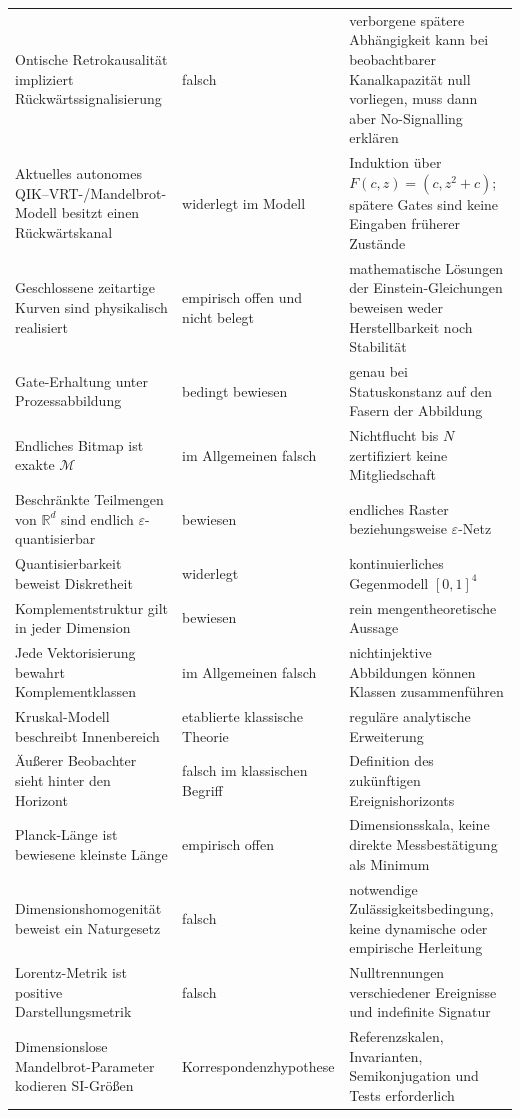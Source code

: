 \documentclass[11pt,a4paper]{article}
\theoremstyle{remark}
\newcommand{\M}{\mathcal{M}}
\newcommand{\R}{\mathbb{R}}
\newcommand{\eps}{\varepsilon}
\begin{document}
\begin{longtable}{>{\raggedright\arraybackslash}p{}
                  >{\raggedright\arraybackslash}p{}
                  >{\raggedright\arraybackslash}p{}}
Ontische Retrokausalität impliziert Rückwärtssignalisierung & falsch & verborgene spätere Abhängigkeit kann bei beobachtbarer Kanalkapazität null vorliegen, muss dann aber No-Signalling erklären \\
Aktuelles autonomes QIK--VRT-/Mandelbrot-Modell besitzt einen Rückwärtskanal & widerlegt im Modell & Induktion über \(F(c,z)=(c,z^2+c)\); spätere Gates sind keine Eingaben früherer Zustände \\
Geschlossene zeitartige Kurven sind physikalisch realisiert & empirisch offen und nicht belegt & mathematische Lösungen der Einstein-Gleichungen beweisen weder Herstellbarkeit noch Stabilität \\
Gate-Erhaltung unter Prozessabbildung & bedingt bewiesen & genau bei Statuskonstanz auf den Fasern der Abbildung \\
Endliches Bitmap ist exakte \(\M\) & im Allgemeinen falsch & Nichtflucht bis \(N\) zertifiziert keine Mitgliedschaft \\
Beschränkte Teilmengen von \(\R^d\) sind endlich \(\eps\)-quantisierbar & bewiesen & endliches Raster beziehungsweise \(\eps\)-Netz \\
Quantisierbarkeit beweist Diskretheit & widerlegt & kontinuierliches Gegenmodell \([0,1]^4\) \\
Komplementstruktur gilt in jeder Dimension & bewiesen & rein mengentheoretische Aussage \\
Jede Vektorisierung bewahrt Komplementklassen & im Allgemeinen falsch & nichtinjektive Abbildungen können Klassen zusammenführen \\
Kruskal-Modell beschreibt Innenbereich & etablierte klassische Theorie & reguläre analytische Erweiterung \\
Äußerer Beobachter sieht hinter den Horizont & falsch im klassischen Begriff & Definition des zukünftigen Ereignishorizonts \\
Planck-Länge ist bewiesene kleinste Länge & empirisch offen & Dimensionsskala, keine direkte Messbestätigung als Minimum \\
Dimensionshomogenität beweist ein Naturgesetz & falsch & notwendige Zulässigkeitsbedingung, keine dynamische oder empirische Herleitung \\
Lorentz-Metrik ist positive Darstellungsmetrik & falsch & Nulltrennungen verschiedener Ereignisse und indefinite Signatur \\
Dimensionslose Mandelbrot-Parameter kodieren SI-Größen & Korrespondenz\-hypothese & Referenzskalen, Invarianten, Semikonjugation und Tests erforderlich \\

\end{longtable}
\end{document}
